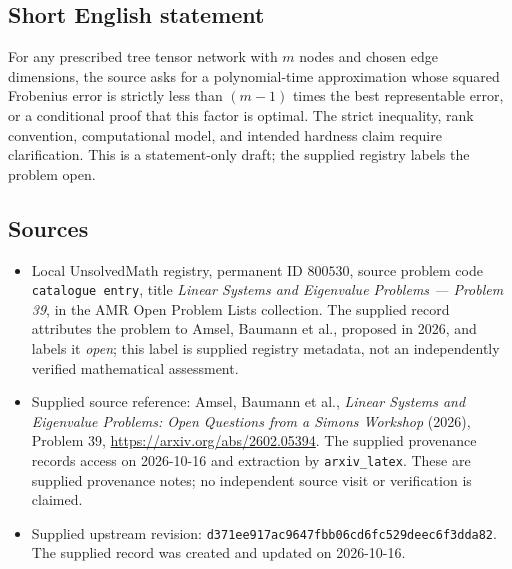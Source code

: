 \documentclass[11pt]{article}
\begin{document}
\subsection{Short English statement}
For any prescribed tree tensor network with \(m\) nodes and chosen edge dimensions, the source asks for a polynomial-time approximation whose squared Frobenius error is strictly less than \((m-1)\) times the best representable error, or a conditional proof that this factor is optimal. The strict inequality, rank convention, computational model, and intended hardness claim require clarification. This is a statement-only draft; the supplied registry labels the problem open.
\subsection{Sources}
\begin{itemize}
\item Local UnsolvedMath registry, permanent ID \(800530\), source problem code \texttt{catalogue entry}, title \emph{Linear Systems and Eigenvalue Problems --- Problem 39}, in the AMR Open Problem Lists collection. The supplied record attributes the problem to Amsel, Baumann et al., proposed in 2026, and labels it \emph{open}; this label is supplied registry metadata, not an independently verified mathematical assessment.
\item Supplied source reference: Amsel, Baumann et al., \emph{Linear Systems and Eigenvalue Problems: Open Questions from a Simons Workshop} (2026), Problem 39, \url{https://arxiv.org/abs/2602.05394}. The supplied provenance records access on 2026-10-16 and extraction by \texttt{arxiv\_latex}. These are supplied provenance notes; no independent source visit or verification is claimed.
\item Supplied upstream revision: \texttt{d371ee917ac9647fbb06cd6fc529deec6f3dda82}. The supplied record was created and updated on 2026-10-16.
\end{itemize}
\end{document}
